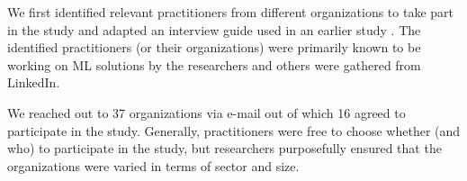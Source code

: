 We first identified relevant practitioners from different organizations to take part in the study and adapted an interview guide used in an earlier study \cite{Lwakatare2019}. \DIFaddbegin {}\DIFaddend The identified practitioners (or their organizations) were primarily known to be working on ML solutions by the researchers and others were gathered from LinkedIn. %

We reached out to 37 organizations via e-mail out of which 16 agreed to participate in the study. %
Generally, practitioners were free to choose whether (and who) to participate in the study, but researchers purposefully ensured that the organizations were varied in terms of sector and size. 

